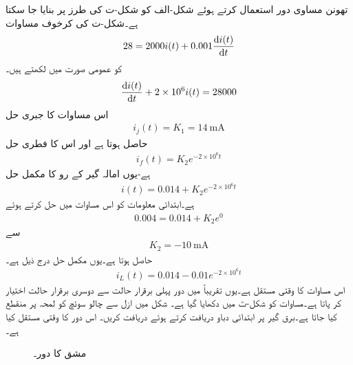 تھونن مساوی دور استعمال کرتے ہوئے شکل-الف کو شکل-ت کی طرز پر بنایا جا سکتا ہے۔شکل-ت کی کرخوف مساوات
\begin{align*}
28=2000 i(t)+0.001 \frac{\dif i(t)}{\dif t}
\end{align*}
کو عمومی صورت میں لکھتے ہیں۔
\begin{align*}
\frac{\dif i(t)}{\dif t}+2\times 10^6 i(t)=28000
\end{align*}
اس مساوات کا جبری حل 
\begin{align*}
i_j(t)=K_1=\SI{14}{\milli\ampere}
\end{align*}
حاصل ہوتا ہے اور اس کا فطری حل
\begin{align*}
i_f(t)=K_2 e^{-2\times 10^6 t}
\end{align*}
ہے-یوں امالہ گیر کے رو کا مکمل حل
\begin{align*}
i(t)=0.014+K_2 e^{-2\times 10^6 t}
\end{align*}
ہے۔ابتدائی معلومات کو اس مساوات میں حل کرتے ہوئے
\begin{align*}
0.004=0.014+K_2 e^{0}
\end{align*}
سے
\begin{align*}
K_2=\SI{-10}{\milli\ampere}
\end{align*}
حاصل ہوتا ہے۔یوں مکمل حل درج ذیل ہے۔
\begin{align}\label{مساوات_عارضی_امالہ_گیر_مکمل_حل_ب}
i_L(t)=0.014-0.01e^{-2\times 10^6 t}
\end{align} 
اس مساوات کا وقتی مستقل  ہے۔یوں تقریباً  میں دور پہلی برقرار حالت سے دوسری برقرار حالت اختیار کر پاتا ہے۔مساوات  کو شکل-ٹ میں دکھایا گیا ہے۔
شکل  میں ازل سے چالو سوئچ کو  لمحہ  پر منقطع کیا جاتا ہے۔برق گیر پر ابتدائی دباو دریافت کرتے ہوئے  دریافت کریں۔ اس دور کا وقتی مستقل کیا ہے۔
\begin{figure}
\centering
{}
\caption{مشق  کا دور۔}
\label{شکل_عارضی_مشق_برق_گیر_الف}
\end{figure}

